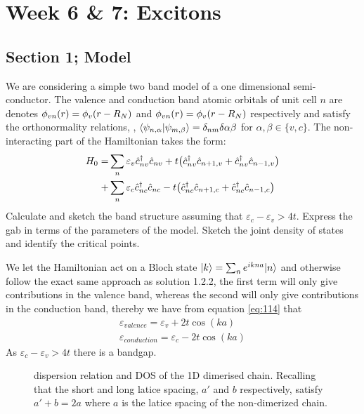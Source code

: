 \section{Week 6 \& 7: Excitons}
\subsection{Section 1; Model}
\begin{exercise}
We are considering a simple two band model of a one dimensional semi-conductor. The valence and conduction band atomic orbitals of unit cell $n$ are denotes $\phi_{vn}\qty(r) = \phi_v\qty(r- R_N)$ and $\phi_{vn}\qty(r) = \phi_v\qty(r- R_N)$ respectively and satisfy the orthonormality relations, \ie, $\ip{\psi_{n,\alpha}}{\psi_{m,\beta}} = \delta_{nm}\delta{\alpha\beta}$ for $\alpha,\beta \in \{v,c\}$. The non-interacting part of the Hamiltonian takes the form: 
\begin{equation}
    \begin{split}
        H_0 =& \sum_n \varepsilon_v \hat{c}_{nv}^{\dagger} \hat{c}_{nv} + t \qty(\hat{c}_{nv}^{\dagger} \hat{c}_{n+1,v} + \hat{c}_{nv}^{\dagger}\hat{c}_{n-1,v})\\
        +& \sum_n \varepsilon_c \hat{c}_{nc}^{\dagger} \hat{c}_{nc} - t \qty(\hat{c}_{nc}^{\dagger} \hat{c}_{n+1,c} + \hat{c}_{nc}^{\dagger}\hat{c}_{n-1,c})\\
    \end{split}
\end{equation}
Calculate and sketch the band structure assuming that $\varepsilon_c - \varepsilon_v > 4t$. Express the gab in terms of the parameters of the model. Sketch the joint density of states and identify the critical points.
\end{exercise}

\begin{solution}
We let the Hamiltonian act on a Bloch state $|k\rangle = \sum_n e^{ikna} |n\rangle$ and otherwise follow the exact same approach as solution 1.2.2, the first term will only give contributions in the valence band, whereas the second will only give contributions in the conduction band, thereby we have from equation \ref{eq:114} that
\begin{equation}
\begin{split}
    \varepsilon_{valence} = \varepsilon_v + 2t\cos(ka) \\
    \varepsilon_{conduction} = \varepsilon_c - 2t\cos(ka)
    \end{split}
\end{equation}
As $\varepsilon_c - \varepsilon_v > 4t$ there is a bandgap.


\begin{figure}[!ht]
    \centering
    
    \caption{dispersion relation and DOS of the 1D dimerised chain. Recalling that the short and long latice spacing, $a'$ and $b$ respectively, satisfy $a'+b = 2a$ where $a$ is the latice spacing of the non-dimerized chain.}
    \label{fig:1D_Dimer_Exciton}
\end{figure}

\end{solution}



